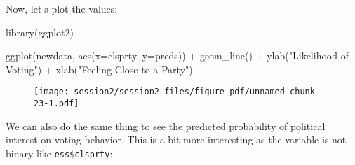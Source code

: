 \documentclass[
  letterpaper,
  DIV=11,
  numbers=noendperiod]{scrreprt}
\newenvironment{Shaded}{\begin{snugshade}}{\end{snugshade}}
\newcommand{\AttributeTok}[1]{\textcolor[rgb]{0.40,0.45,0.13}{#1}}
\newcommand{\FunctionTok}[1]{\textcolor[rgb]{0.28,0.35,0.67}{#1}}
\newcommand{\NormalTok}[1]{\textcolor[rgb]{0.00,0.23,0.31}{#1}}
\newcommand{\OtherTok}[1]{\textcolor[rgb]{0.00,0.23,0.31}{#1}}
\newcommand{\SpecialCharTok}[1]{\textcolor[rgb]{0.37,0.37,0.37}{#1}}
\newcommand{\StringTok}[1]{\textcolor[rgb]{0.13,0.47,0.30}{#1}}
\begin{document}
\begin{Shaded}
\end{Shaded}

Now, let's plot the values:

\begin{Shaded}
\begin{Highlighting}[]
\FunctionTok{library}\NormalTok{(ggplot2)}

\FunctionTok{ggplot}\NormalTok{(newdata, }\FunctionTok{aes}\NormalTok{(}\AttributeTok{x=}\NormalTok{clsprty, }\AttributeTok{y=}\NormalTok{preds)) }\SpecialCharTok{+}
    \FunctionTok{geom\_line}\NormalTok{() }\SpecialCharTok{+}
    \FunctionTok{ylab}\NormalTok{(}\StringTok{"Likelihood of Voting"}\NormalTok{) }\SpecialCharTok{+} \FunctionTok{xlab}\NormalTok{(}\StringTok{"Feeling Close to a Party"}\NormalTok{)}
\end{Highlighting}
\end{Shaded}

\begin{figure}[H]

{\centering \texttt{[image: session2/session2\_files/figure-pdf/unnamed-chunk-23-1.pdf]}

}

\end{figure}

We can also do the same thing to see the predicted probability of
political interest on voting behavior. This is a bit more interesting as
the variable is not binary like \texttt{ess\$clsprty}:
\end{document}
